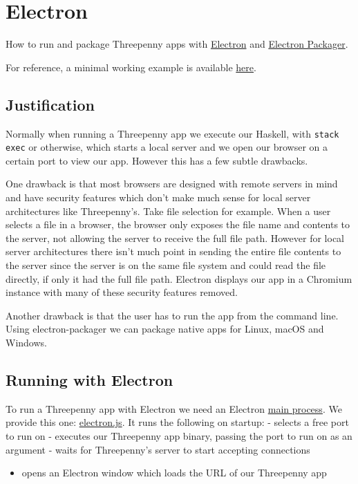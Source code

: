 \documentclass[11pt]{article}
\author{Jeremy}
\date{\today}
\title{}
\begin{document}
\tableofcontents

\section{Electron}
\label{sec:orgb9e4dda}

How to run and package Threepenny apps with \href{https://electron.atom.io}{Electron} and \href{https://github.com/electron-userland/electron-packager\#electron-packager}{Electron Packager}.

For reference, a minimal working example is available \href{https://github.com/barischj/threepenny-gui-electron-example}{here}.

\subsection{Justification}
\label{sec:org7377b81}

Normally when running a Threepenny app we execute our Haskell, with \texttt{stack exec}
or otherwise, which starts a local server and we open our browser on a certain
port to view our app. However this has a few subtle drawbacks.

One drawback is that most browsers are designed with remote servers in mind and
have security features which don't make much sense for local server
architectures like Threepenny's. Take file selection for example. When a user
selects a file in a browser, the browser only exposes the file name and contents
to the server, not allowing the server to receive the full file path. However
for local server architectures there isn't much point in sending the entire file
contents to the server since the server is on the same file system and could
read the file directly, if only it had the full file path. Electron displays our
app in a Chromium instance with many of these security features removed.

Another drawback is that the user has to run the app from the command line.
Using electron-packager we can package native apps for Linux, macOS and Windows.

\subsection{Running with Electron}
\label{sec:org562eb1f}
To run a Threepenny app with Electron we need an Electron \href{https://electron.atom.io/docs/tutorial/quick-start/\#main-process}{main process}. We
provide this one: \href{./electron/electron.js}{electron.js}. It runs the following on startup: - selects a
free port to run on - executes our Threepenny app binary, passing the port to
run on as an argument - waits for Threepenny's server to start accepting
connections
\begin{itemize}
\item opens an Electron window which loads the URL of our Threepenny app
\end{itemize}
\end{document}
